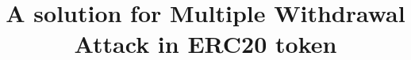 \documentclass[compsoc, conference, a4paper, 10pt, times]{IEEEtran}
\begin{document}
\title{A solution for Multiple Withdrawal Attack in ERC20 token}
\author{
	\IEEEauthorblockN{                  }
	\IEEEauthorblockA{                  }
}

\maketitle
\thispagestyle{fancy}
\pagestyle{fancy}
\IEEEpubidadjcol


\IEEEpeerreviewmaketitle







\end{document}
